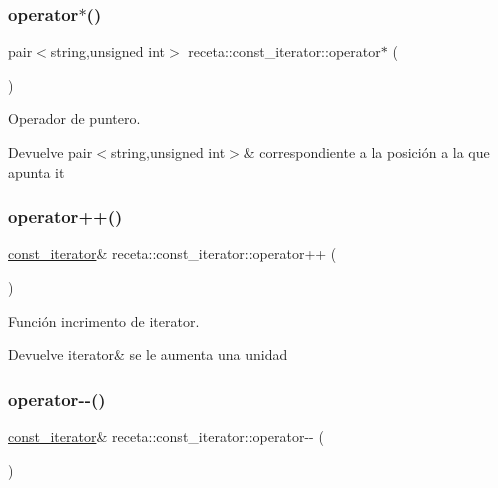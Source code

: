 \subsubsection{\texorpdfstring{operator$\ast$()}{operator*()}}
{\footnotesize\ttfamily pair$<$string,unsigned int$>$ receta\+::const\+\_\+iterator\+::operator$\ast$ (\begin{DoxyParamCaption}{ }\end{DoxyParamCaption})}



Operador de puntero. 

\begin{DoxyReturn}{Devuelve}
pair$<$string,unsigned int$>$\& correspondiente a la posición a la que apunta it 
\end{DoxyReturn}
\mbox{\label{classreceta_1_1const__iterator_a83cee4f2729a04af846cf05f8b688f59}} 
\subsubsection{\texorpdfstring{operator++()}{operator++()}}
{\footnotesize\ttfamily \hyperlink{classreceta_1_1const__iterator}{const\+\_\+iterator}\& receta\+::const\+\_\+iterator\+::operator++ (\begin{DoxyParamCaption}{ }\end{DoxyParamCaption})}



Función incrimento de iterator. 

\begin{DoxyReturn}{Devuelve}
iterator\& se le aumenta una unidad 
\end{DoxyReturn}
\mbox{\label{classreceta_1_1const__iterator_a513bb8ea8afe6c3a49dd240588800ded}} 
\subsubsection{\texorpdfstring{operator-\/-\/()}{operator--()}}
{\footnotesize\ttfamily \hyperlink{classreceta_1_1const__iterator}{const\+\_\+iterator}\& receta\+::const\+\_\+iterator\+::operator-\/-\/ (\begin{DoxyParamCaption}{ }\end{DoxyParamCaption})}



